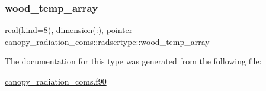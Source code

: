 \mbox{\label{structcanopy__radiation__coms_1_1radscrtype_ab2c191fb2e19839b8465587f40b5329a}} 
\subsubsection{\texorpdfstring{wood\+\_\+temp\+\_\+array}{wood\_temp\_array}}
{\footnotesize\ttfamily real(kind=8), dimension(\+:), pointer canopy\+\_\+radiation\+\_\+coms\+::radscrtype\+::wood\+\_\+temp\+\_\+array}



The documentation for this type was generated from the following file\+:\begin{DoxyCompactItemize}
\item 
\hyperlink{canopy__radiation__coms_8f90}{canopy\+\_\+radiation\+\_\+coms.\+f90}\end{DoxyCompactItemize}
